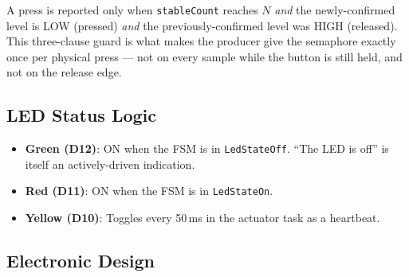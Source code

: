 \documentclass[12pt]{article}
\begin{document}
A press is reported only when \texttt{stableCount} reaches $N$ \emph{and} the newly-confirmed level is LOW (pressed) \emph{and} the previously-confirmed level was HIGH (released). This three-clause guard is what makes the producer give the semaphore exactly once per physical press --- not on every sample while the button is still held, and not on the release edge.

\subsection{LED Status Logic}

\begin{itemize}
  \item \textbf{Green (D12)}: ON when the FSM is in \texttt{LedStateOff}. \enquote{The LED is off} is itself an actively-driven indication.
  \item \textbf{Red (D11)}: ON when the FSM is in \texttt{LedStateOn}.
  \item \textbf{Yellow (D10)}: Toggles every 50\,ms in the actuator task as a heartbeat.
\end{itemize}

\subsection{Electronic Design}
\end{document}

